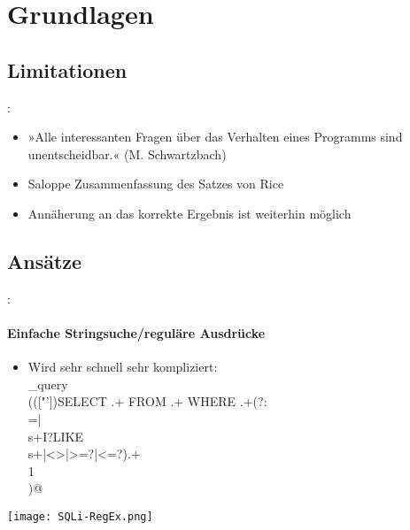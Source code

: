 \section{Grundlagen}
    \subsection{Limitationen}
        \begin{frame}{\secname: \subsecname}
            \begin{itemize}
                \item »Alle interessanten Fragen über das Verhalten eines Programms sind unentscheidbar.« (M. Schwartzbach)
                \item Saloppe Zusammenfassung des Satzes von Rice
                \item Annäherung an das korrekte Ergebnis ist weiterhin möglich
            \end{itemize}
        \end{frame}

    \subsection{Ansätze}
        \begin{frame}{\secname: \subsecname}
            \framesubtitle{Einfache Stringsuche/reguläre Ausdrücke}
            \begin{itemize}
                \item Wird sehr schnell sehr kompliziert:\\
                      \lstinline@mysql_query\\((["'])SELECT .+ FROM .+ WHERE .+(?:\\=|\\s+I?LIKE\\s+|<>|>=?|<=?).+\\1\\)@
            \end{itemize}
            \texttt{[image: SQLi-RegEx.png]}
        \end{frame}


